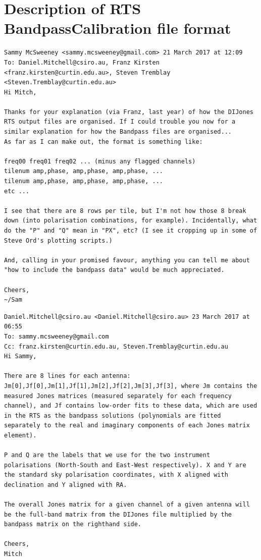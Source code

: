 \documentclass{book}
\begin{document}
\chapter{Description of RTS BandpassCalibration file format}

\begin{lstlisting}
Sammy McSweeney <sammy.mcsweeney@gmail.com>	21 March 2017 at 12:09
To: Daniel.Mitchell@csiro.au, Franz Kirsten <franz.kirsten@curtin.edu.au>, Steven Tremblay <Steven.Tremblay@curtin.edu.au>
Hi Mitch,

Thanks for your explanation (via Franz, last year) of how the DIJones RTS output files are organised. If I could trouble you now for a similar explanation for how the Bandpass files are organised...
As far as I can make out, the format is something like:

freq00 freq01 freq02 ... (minus any flagged channels)
tilenum amp,phase, amp,phase, amp,phase, ...
tilenum amp,phase, amp,phase, amp,phase, ...
etc ...

I see that there are 8 rows per tile, but I'm not how those 8 break down (into polarisation combinations, for example). Incidentally, what do the "P" and "Q" mean in "PX", etc? (I see it cropping up in some of Steve Ord's plotting scripts.)

And, calling in your promised favour, anything you can tell me about "how to include the bandpass data" would be much appreciated.

Cheers,
~/Sam
\end{lstlisting}

\begin{lstlisting}
Daniel.Mitchell@csiro.au <Daniel.Mitchell@csiro.au>	23 March 2017 at 06:55
To: sammy.mcsweeney@gmail.com
Cc: franz.kirsten@curtin.edu.au, Steven.Tremblay@curtin.edu.au
Hi Sammy,

There are 8 lines for each antenna: Jm[0],Jf[0],Jm[1],Jf[1],Jm[2],Jf[2],Jm[3],Jf[3], where Jm contains the measured Jones matrices (measured separately for each frequency channel), and Jf contains low-order fits to these data, which are used in the RTS as the bandpass solutions (polynomials are fitted separately to the real and imaginary components of each Jones matrix element).

P and Q are the labels that we use for the two instrument polarisations (North-South and East-West respectively). X and Y are the standard sky polarisation coordinates, with X aligned with declination and Y aligned with RA.

The overall Jones matrix for a given channel of a given antenna will be the full-band matrix from the DIJones file multiplied by the bandpass matrix on the righthand side.

Cheers,
Mitch
\end{lstlisting}
\end{document}

